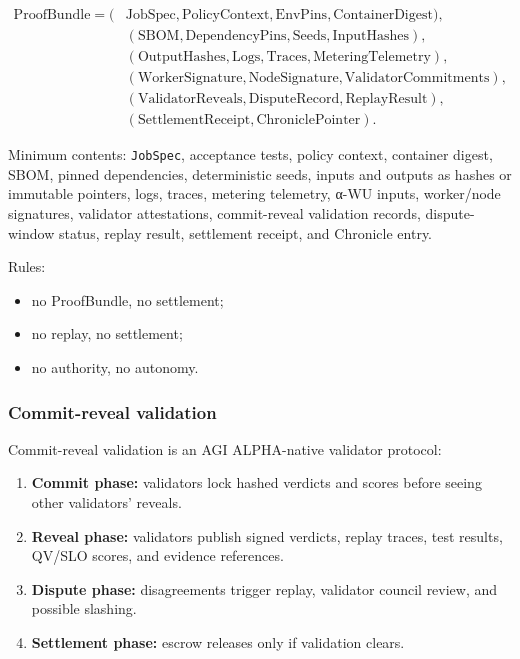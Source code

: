 \documentclass[
  11pt,
]{article}
\providecommand{\tightlist}{%
  \setlength{\itemsep}{0pt}\setlength{\parskip}{0pt}}
\begin{document}
\[
\begin{aligned}
\mathrm{ProofBundle}=(&\mathrm{JobSpec},\mathrm{PolicyContext},\mathrm{EnvPins},\mathrm{ContainerDigest}),\\
& (\mathrm{SBOM},\mathrm{DependencyPins},\mathrm{Seeds},\mathrm{InputHashes}),\\
& (\mathrm{OutputHashes},\mathrm{Logs},\mathrm{Traces},\mathrm{MeteringTelemetry}),\\
& (\mathrm{WorkerSignature},\mathrm{NodeSignature},\mathrm{ValidatorCommitments}),\\
& (\mathrm{ValidatorReveals},\mathrm{DisputeRecord},\mathrm{ReplayResult}),\\
& (\mathrm{SettlementReceipt},\mathrm{ChroniclePointer}).
\end{aligned}
\]

Minimum contents: \texttt{JobSpec}, acceptance tests, policy context,
container digest, SBOM, pinned dependencies, deterministic seeds, inputs
and outputs as hashes or immutable pointers, logs, traces, metering
telemetry, α-WU inputs, worker/node signatures, validator attestations,
commit-reveal validation records, dispute-window status, replay result,
settlement receipt, and Chronicle entry.

Rules:

\begin{itemize}
\tightlist
\item
  no ProofBundle, no settlement;
\item
  no replay, no settlement;
\item
  no authority, no autonomy.
\end{itemize}

\subsubsection{Commit-reveal validation}\label{commit-reveal-validation}

Commit-reveal validation is an AGI ALPHA-native validator protocol:

\begin{enumerate}
\def\labelenumi{\arabic{enumi}.}
\tightlist
\item
  \textbf{Commit phase:} validators lock hashed verdicts and scores
  before seeing other validators' reveals.
\item
  \textbf{Reveal phase:} validators publish signed verdicts, replay
  traces, test results, QV/SLO scores, and evidence references.
\item
  \textbf{Dispute phase:} disagreements trigger replay, validator
  council review, and possible slashing.
\item
  \textbf{Settlement phase:} escrow releases only if validation clears.
\end{enumerate}
\end{document}
